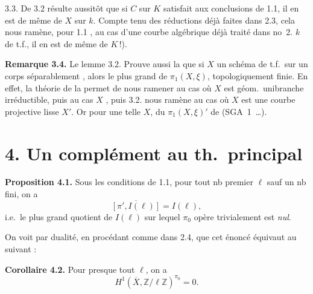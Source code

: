 \documentclass[11pt,a4paper]{article}
\begin{document}
3.3. De 3.2 résulte aussitôt que si  $C$ sur $K$ satisfait aux conclusions de 1.1, il en est de même de $X$ sur $k$. Compte tenu des réductions déjà faites dans 2.3, cela nous ramène, pour  1.1 , au cas d'une courbe algébrique  déjà traité dans \struck{\ill{}} no~2.   $k$  de t.f., il en est de même de $K$\,!).

\textbf{Remarque 3.4.} Le lemme 3.2. Prouve aussi la  que si $X$  un schéma de t.f.\ sur un corps  séparablement , alors le \struck{\ill{}} plus grand    de $\pi_1(X,\xi)$,  topologiquement  finie. En effet, la théorie de la  \struck{\ill{}}  permet de nous ramener au cas où $X$ est géom.\ unibranche  irréductible,  puis au \struck{\ill{}} cas $X$  \add{\ill{}}, puis 3.2. \struck{\ill{}} nous ramène au cas où $X$ est une \add{\ill{}}  courbe projective lisse $X'$. Or pour une telle $X$,     du $\pi_1(X,\xi)'$   de (SGA~1~…).

\section*{4. Un complément au th.\ principal}

\textbf{Proposition 4.1.} Sous les conditions de 1.1, pour tout  nb premier $\ell$ sauf un nb fini,  on a
\[
  \overline{[\pi', I(\ell)]} = I(\ell),
\]
i.e.\ le plus grand quotient  de $I(\ell)$ sur lequel $\pi_0$ opère trivialement est \emph{nul}.

On voit par dualité, en procédant comme dans 2.4, que cet énoncé équivaut au suivant :

\textbf{ Corollaire 4.2.} Pour presque tout $\ell$, on a
\[
  H^1(\overline{X}, \mathbb{Z}/\ell\mathbb{Z})^{\pi_0} = 0 .
\]
\end{document}
